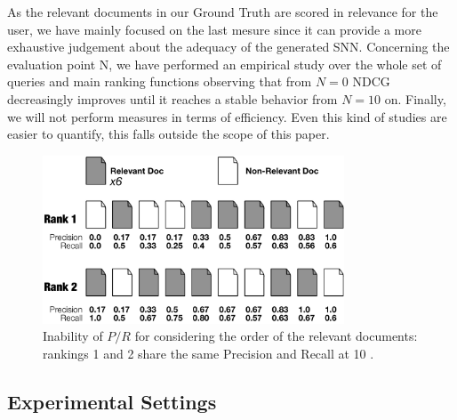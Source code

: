 \documentclass{llncs}
\begin{document}
As the relevant documents in our Ground Truth are scored in relevance for the user, we have mainly focused on the last mesure since it can provide a more exhaustive judgement about the adequacy of the generated SNN. Concerning the evaluation point N, we have performed an empirical study over the whole set of queries and main ranking functions observing that from  $N=0$ NDCG decreasingly improves until it reaches a stable behavior from $N=10$ on. Finally, we will not perform measures in terms of efficiency. Even this kind of studies are easier to quantify, this falls outside the scope of this paper.


\begin{figure}[h!]
\centering
\includegraphics[width=0.8\textwidth]{figure/precisionRecall}
\caption{Inability of $P/R$ for considering the order of the relevant documents: rankings 1 and 2 share the same Precision and Recall at 10 .}
\label{fig:precisionRecall}%
\end{figure}

\subsection{Experimental Settings}
\label{sec:experimentalSettings}
\end{document}
